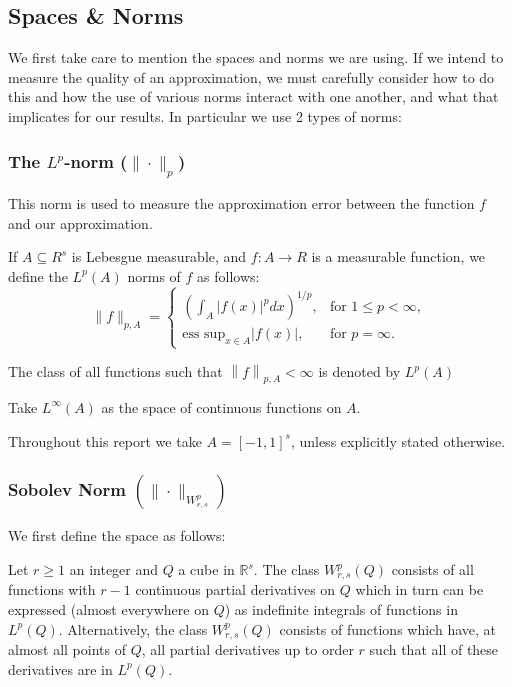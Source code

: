 \documentclass[11pt,a4paper]{article}
\theoremstyle{plain}
\theoremstyle{definition}
\theoremstyle{remark}
\begin{document}
\subsection{Spaces \& Norms}
We first take care to mention the spaces and norms we are using. If we intend to measure the quality of an approximation, we must carefully consider how to do this and how the use of various norms interact with one another, and what that implicates for our results. In particular we use 2 types of norms:

\subsubsection{The \( L^p \)-norm (\( \|\cdot\|_p \))}

This norm is used to measure the approximation error between the function \( f \) and our approximation.

If \( A \subseteq R^{s}\) is Lebesgue measurable, and \(f : A \to R\) is a measurable function, we define the \(L^{p} (A)\) norms of \(f\) as follows:   
   \[
   \|f\|_{p,A} = 
   \begin{cases} 
   \left( \int_{A} |f(x)|^p dx \right)^{1/p}, & \text{for } 1 \leq p < \infty, \\
   \text{ess sup}_{x \in A} |f(x)|, & \text{for } p = \infty.
   \end{cases}
   \]


   The class of all functions such that \(\left\lVert f\right\rVert_{p,A} < \infty \) is denoted by \(L^p(A)\) 

   Take \(L^{\infty }(A)\) as the space of continuous functions on \(A\).

   Throughout this report we take \(A = [-1,1]^s\), unless explicitly stated otherwise.

   

\subsubsection{Sobolev Norm \((\|\cdot\|_{W^p_{r,s}})\) }

We first define the space as follows: 

Let \(r \geq 1\) an integer and \(Q\) a cube in \(\mathbb{R}^{s}\). The class \(W^p_{r,s}(Q)\) consists of all functions with \(r - 1\) continuous partial derivatives on \(Q\) which in turn can be expressed (almost everywhere on \(Q\)) as indefinite integrals of functions in \(L^p(Q)\). Alternatively, the class \(W^p_{r,s}(Q)\) consists of functions which have, at almost all points of \(Q\), all partial derivatives up to order \(r\) such that all of these derivatives are in \(L^p(Q)\). 
\end{document}
